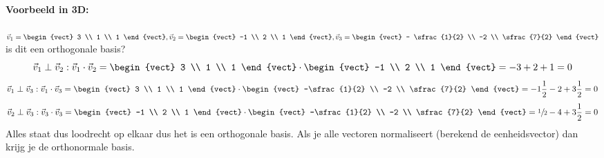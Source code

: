 \paragraph{Voorbeeld in 3D:} $\vec{v}_1 = \begin{vect} 3 \\ 1 \\ 1 \end{vect}, \vec{v}_2 = \begin{vect} -1 \\ 2 \\ 1 \end{vect}, \vec{v}_3 = \begin{vect} - \sfrac{1}{2} \\ -2 \\ \sfrac{7}{2} \end{vect}$ is dit een orthogonale basis?
\[ \vec{v}_1 \perp \vec{v}_2: \vec{v}_1 \cdot \vec{v}_2 = \begin{vect} 3 \\ 1 \\ 1 \end{vect} \cdot \begin{vect} -1 \\ 2 \\ 1 \end{vect} = -3 + 2 + 1 = 0 \]
\[ \vec{v}_1 \perp \vec{v}_3: \vec{v}_1 \cdot \vec{v}_3 = \begin{vect} 3 \\ 1 \\ 1 \end{vect} \cdot \begin{vect} -\sfrac{1}{2} \\ -2 \\ \sfrac{7}{2} \end{vect} = - 1 \frac{1}{2} - 2 + 3 \frac{1}{2} = 0 \]
\[ \vec{v}_2 \perp \vec{v}_3: \vec{v}_3 \cdot \vec{v}_3 = \begin{vect} -1 \\ 2 \\ 1 \end{vect} \cdot \begin{vect} -\sfrac{1}{2} \\ -2 \\ \sfrac{7}{2} \end{vect} = \sfrac{1}{2} - 4 + 3 \frac{1}{2} = 0 \]
Alles staat dus loodrecht op elkaar dus het is een orthogonale basis. Als je alle vectoren normaliseert (berekend de eenheidsvector) dan krijg je de orthonormale basis.


